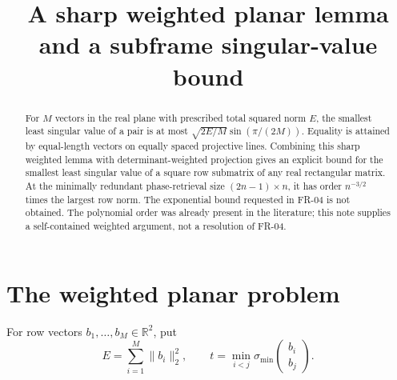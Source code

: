 \documentclass[11pt]{article}
\title{A sharp weighted planar lemma and a subframe singular-value bound}
\author{}\date{}
\newcommand{\R}{\mathbb R}\newcommand{\sm}{\sigma_{\min}}
\begin{document}
\maketitle
\begin{abstract}
For $M$ vectors in the real plane with prescribed total squared norm $E$, the smallest least singular value of a pair is at most $\sqrt{2E/M}\sin(\pi/(2M))$. Equality is attained by equal-length vectors on equally spaced projective lines. Combining this sharp weighted lemma with determinant-weighted projection gives an explicit bound for the smallest least singular value of a square row submatrix of any real rectangular matrix. At the minimally redundant phase-retrieval size $(2n-1)\times n$, it has order $n^{-3/2}$ times the largest row norm. The exponential bound requested in FR-04 is not obtained. The polynomial order was already present in the literature; this note supplies a self-contained weighted argument, not a resolution of FR-04.
\end{abstract}

\section{The weighted planar problem}
For row vectors $b_1,\ldots,b_M\in\R^2$, put
\[
 E=\sum_{i=1}^M\|b_i\|_2^2,\qquad
 t=\min_{i<j}\sm\begin{pmatrix}b_i\\b_j\end{pmatrix}.
\]
\end{document}
